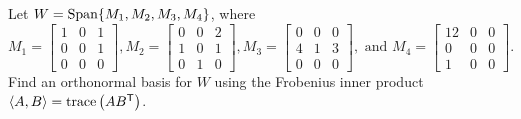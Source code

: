 
\ExampleIntro

\begin{example} Let $W = \text{Span}\{M_1, M_2, M_3, M_4\}$, where 
\[M_1 = \left[ \begin{array}{ccc} 1&0&1\\0&0&1\\0&0&0 \end{array} \right], M_2 = \left[ \begin{array}{ccc} 0&0&2\\1&0&1\\0&1&0 \end{array} \right], M_3 = \left[ \begin{array}{ccc} 0&0&0\\4&1&3\\0&0&0 \end{array} \right], \text{ and } M_4 = \left[ \begin{array}{ccc} 12&0&0\\0&0&0\\1&0&0 \end{array} \right].\] Find an orthonormal basis for $W$ using the Frobenius inner product $\langle A,B \rangle  = \text{trace}\left(AB^{\mathsf{T}}\right)$. 


\end{example}
